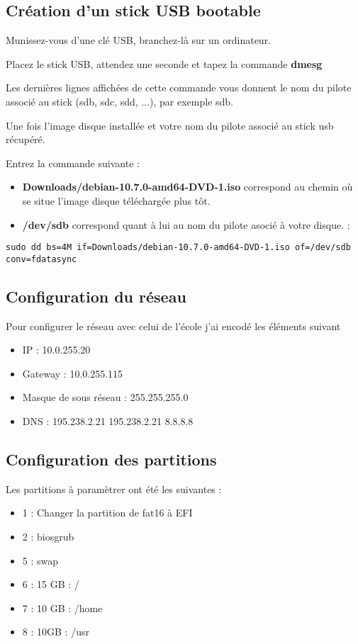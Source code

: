 \documentclass[a4paper, 12pt]{article}
\begin{document}
\begin{flushleft}
       \subsection{Création d'un stick USB bootable}
       \item Munissez-vous d'une clé USB, branchez-là sur un ordinateur.
       \item Placez le stick USB, attendez une seconde et tapez la commande \textbf{dmesg}
       \item Les dernières lignes affichées de cette commande vous donnent le nom du pilote associé au stick (sdb,
sdc, sdd, ...), par exemple sdb.
        \item Une fois l'image disque installée et votre nom du pilote associé au stick usb récupéré. 
        \item Entrez la commande suivante : 
        \begin{itemize}
            \item \textbf{Downloads/debian-10.7.0-amd64-DVD-1.iso} correspond au chemin où se situe l'image disque téléchargée plus tôt. 
            \item \textbf{/dev/sdb} correspond quant à lui au nom du pilote asocié à votre disque. : 
        \end{itemize}
        \begin{lstlisting}
sudo dd bs=4M if=Downloads/debian-10.7.0-amd64-DVD-1.iso of=/dev/sdb conv=fdatasync
        \end{lstlisting}
        

       \subsection{Configuration du réseau}
       \item Pour configurer le réseau avec celui de l'école j'ai encodé les éléments suivant
       \begin{itemize}
           \item IP : 10.0.255.20
           \item Gateway : 10.0.255.115
           \item Masque de sous réseau : 255.255.255.0
           \item DNS : 195.238.2.21 195.238.2.21 8.8.8.8
       \end{itemize}
       \subsection{Configuration des partitions}
       \item Les partitions à paramètrer ont été les suivantes : 
       \begin{itemize}
           \item 1 : Changer la partition de fat16 à EFI
           \item 2 : biosgrub
           \item 5 : swap
           \item 6 : 15 GB : / 
           \item 7 : 10 GB : /home
           \item 8 : 10GB : /usr 
       \end{itemize}

\end{flushleft}
\end{document}
